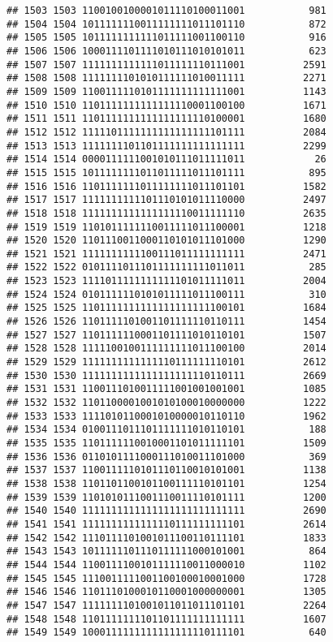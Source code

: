 \documentclass[]{article}
\begin{document}
\begin{verbatim}
## 1503 1503 1100100100001011110100011001           981
## 1504 1504 1011111110011111111011101110           872
## 1505 1505 1011111111111011111001100110           916
## 1506 1506 1000111101111010111010101011           623
## 1507 1507 1111111111111011111110111001          2591
## 1508 1508 1111111101010111111010011111          2271
## 1509 1509 1100111110101111111111111001          1143
## 1510 1510 1101111111111111110001100100          1671
## 1511 1511 1101111111111111111110100001          1680
## 1512 1512 1111101111111111111111101111          2084
## 1513 1513 1111111101101111111111111111          2299
## 1514 1514 0000111111001010111011111011            26
## 1515 1515 1011111111011011111011101111           895
## 1516 1516 1101111111011111111011101101          1582
## 1517 1517 1111111111101110101011110000          2497
## 1518 1518 1111111111111111110011111110          2635
## 1519 1519 1101011111110011111011100001          1218
## 1520 1520 1101110011000110101011101000          1290
## 1521 1521 1111111111100111011111111111          2471
## 1522 1522 0101111011101111111111011011           285
## 1523 1523 1111011111111111101011111011          2004
## 1524 1524 0101111110101011111011100111           310
## 1525 1525 1101111111111111111111100101          1684
## 1526 1526 1101111101001101111110110111          1454
## 1527 1527 1101111110001101111010110101          1507
## 1528 1528 1111100100111111111011100100          2014
## 1529 1529 1111111111111110111111110101          2612
## 1530 1530 1111111111111111111110110111          2669
## 1531 1531 1100111010011111001001001001          1085
## 1532 1532 1101100001001010100010000000          1222
## 1533 1533 1111010110001010000010110110          1962
## 1534 1534 0100111011101111111010110101           188
## 1535 1535 1101111110010001101011111101          1509
## 1536 1536 0110101111000111010011101000           369
## 1537 1537 1100111110101110110010101001          1138
## 1538 1538 1101101100101100111110101101          1254
## 1539 1539 1101010111001110011110101111          1200
## 1540 1540 1111111111111111111111111111          2690
## 1541 1541 1111111111111110111111111101          2614
## 1542 1542 1110111101001011100110111101          1833
## 1543 1543 1011111101110111111000101001           864
## 1544 1544 1100111100101111110011000010          1102
## 1545 1545 1110011111001100100010001000          1728
## 1546 1546 1101110100010110001000000001          1305
## 1547 1547 1111111101001011011011101101          2264
## 1548 1548 1101111111101101111111111111          1607
## 1549 1549 1000111111111111111110111101           640

\end{verbatim}
\end{document}
